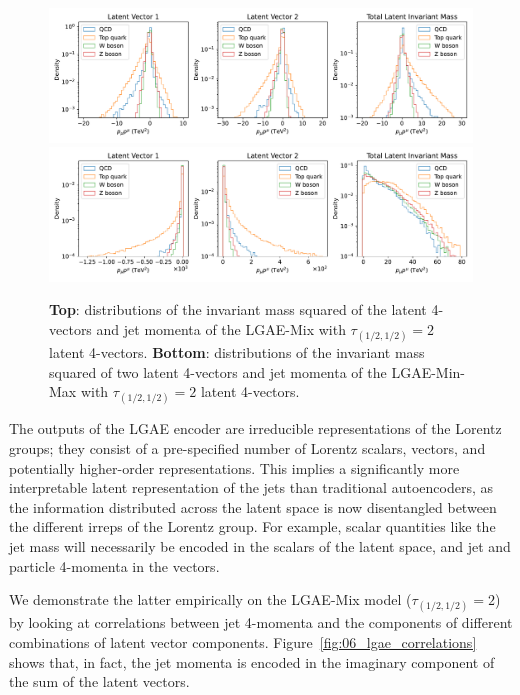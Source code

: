 \begin{figure}[ht!]
    \centering
    \includegraphics[width=\linewidth]{figures/06-ML4Jets/lgae/latent-space-analysis/invariant_masses-mix-log.pdf}
    \includegraphics[width=\linewidth]{figures/06-ML4Jets/lgae/latent-space-analysis/invariant_masses-min_max-selected-log.pdf}
    \caption[Distributions of the invariant mass squared of the latent 4-vectors and jet momenta of the LGAE models.]{
        \textbf{Top}: distributions of the invariant mass squared of the latent 4-vectors and jet momenta of the LGAE-Mix with $\tau_{(1/2, 1/2)} = 2$ latent 4-vectors.
        \textbf{Bottom}: distributions of the invariant mass squared of two latent 4-vectors and jet momenta of the LGAE-Min-Max with $\tau_{(1/2, 1/2)} = 2$ latent 4-vectors.
    }
    \label{fig:06_lgae_distribution}
\end{figure}


The outputs of the LGAE encoder are irreducible representations of the Lorentz groups; they consist of a pre-specified number of Lorentz scalars, vectors, and potentially higher-order representations.
This implies a significantly more interpretable latent representation of the jets than traditional autoencoders, as the information distributed across the latent space is now disentangled between the different irreps of the Lorentz group. 
For example, scalar quantities like the jet mass will necessarily be encoded in the scalars of the latent space, and jet and particle 4-momenta in the vectors. 

We demonstrate the latter empirically on the LGAE-Mix model ($\tau_{(1/2, 1/2)} = 2$) by looking at correlations between jet 4-momenta and the components of different combinations of latent vector components.
Figure~\ref{fig:06_lgae_correlations} shows that, in fact, the jet momenta is encoded in the imaginary component of the sum of the latent vectors.

